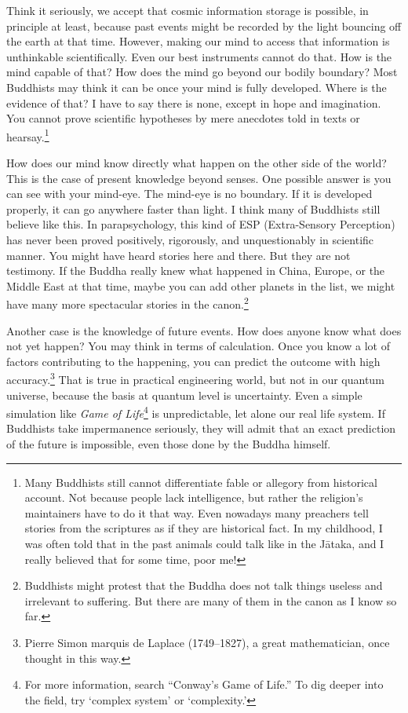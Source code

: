Think it seriously, we accept that cosmic information storage is possible, in principle at least, because past events might be recorded by the light bouncing off the earth at that time. However, making our mind to access that information is unthinkable scientifically. Even our best instruments cannot do that. How is the mind capable of that? How does the mind go beyond our bodily boundary? Most Buddhists may think it can be once your mind is fully developed. Where is the evidence of that? I have to say there is none, except in hope and imagination. You cannot prove scientific hypotheses by mere anecdotes told in texts or hearsay.\footnote{Many Buddhists still cannot differentiate fable or allegory from historical account. Not because people lack intelligence, but rather the religion's maintainers have to do it that way. Even nowadays many preachers tell stories from the scriptures as if they are historical fact. In my childhood, I was often told that in the past animals could talk like in the J\=ataka, and I really believed that for some time, poor me!}

How does our mind know directly what happen on the other side of the world? This is the case of present knowledge beyond senses. One possible answer is you can see with your mind-eye. The mind-eye is no boundary. If it is developed properly, it can go anywhere faster than light. I think many of Buddhists still believe like this. In parapsychology, this kind of ESP (Extra-Sensory Perception) has never been proved positively, rigorously, and unquestionably in scientific manner. You might have heard stories here and there. But they are not testimony. If the Buddha really knew what happened in China, Europe, or the Middle East at that time, maybe you can add other planets in the list, we might have many more spectacular stories in the canon.\footnote{Buddhists might protest that the Buddha does not talk things useless and irrelevant to suffering. But there are many of them in the canon as I know so far.}

Another case is the knowledge of future events. How does anyone know what does not yet happen? You may think in terms of calculation. Once you know a lot of factors contributing to the happening, you can predict the outcome with high accuracy.\footnote{Pierre Simon marquis de Laplace (1749--1827), a great mathematician, once thought in this way.} That is true in practical engineering world, but not in our quantum universe, because the basis at quantum level is uncertainty. Even a simple simulation like \emph{Game of Life}\footnote{For more information, search ``Conway's Game of Life.'' To dig deeper into the field, try `complex system' or `complexity.'} is unpredictable, let alone our real life system. If Buddhists take impermanence seriously, they will admit that an exact prediction of the future is impossible, even those done by the Buddha himself.


